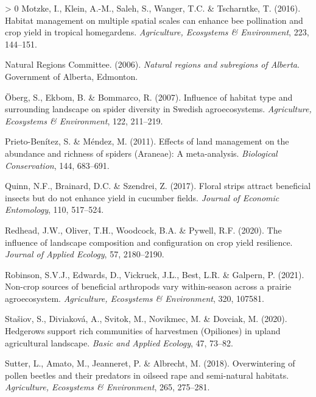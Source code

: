 \documentclass[]{elsarticle} %
\newlength{\cslhangindent}
\newenvironment{CSLReferences}[3] %
 {%
  \setlength{\parindent}{0pt}
  \ifodd #1 \everypar{\setlength{\hangindent}{\cslhangindent}}\ignorespaces\fi
  \ifnum #2 > 0
  \setlength{\parskip}{#2\baselineskip}
  \fi
 }%
 {}
\begin{document}
\begin{CSLReferences}{1}{0}
\leavevmode\hypertarget{ref-motzke2016}{}%
Motzke, I., Klein, A.-M., Saleh, S., Wanger, T.C. \& Tscharntke, T. (2016). Habitat management on multiple spatial scales can enhance bee pollination and crop yield in tropical homegardens. \emph{Agriculture, Ecosystems \& Environment}, 223, 144--151.

\leavevmode\hypertarget{ref-ABRegions2006}{}%
Natural Regions Committee. (2006). \emph{Natural regions and subregions of {Alberta}}. Government of Alberta, Edmonton.

\leavevmode\hypertarget{ref-oberg2007}{}%
Öberg, S., Ekbom, B. \& Bommarco, R. (2007). Influence of habitat type and surrounding landscape on spider diversity in {Swedish} agroecosystems. \emph{Agriculture, Ecosystems {\&} Environment}, 122, 211--219.

\leavevmode\hypertarget{ref-prietoBenitez2011}{}%
Prieto-Benítez, S. \& Méndez, M. (2011). Effects of land management on the abundance and richness of spiders ({Araneae}): A meta-analysis. \emph{Biological Conservation}, 144, 683--691.

\leavevmode\hypertarget{ref-quinn2017}{}%
Quinn, N.F., Brainard, D.C. \& Szendrei, Z. (2017). Floral strips attract beneficial insects but do not enhance yield in cucumber fields. \emph{Journal of Economic Entomology}, 110, 517--524.

\leavevmode\hypertarget{ref-redhead2020}{}%
Redhead, J.W., Oliver, T.H., Woodcock, B.A. \& Pywell, R.F. (2020). The influence of landscape composition and configuration on crop yield resilience. \emph{Journal of Applied Ecology}, 57, 2180--2190.

\leavevmode\hypertarget{ref-robinson2021}{}%
Robinson, S.V.J., Edwards, D., Vickruck, J.L., Best, L.R. \& Galpern, P. (2021). Non-crop sources of beneficial arthropods vary within-season across a prairie agroecosystem. \emph{Agriculture, Ecosystems {\&} Environment}, 320, 107581.

\leavevmode\hypertarget{ref-stasiov2020}{}%
Stašiov, S., Diviaková, A., Svitok, M., Novikmec, M. \& Dovciak, M. (2020). Hedgerows support rich communities of harvestmen ({Opiliones}) in upland agricultural landscape. \emph{Basic and Applied Ecology}, 47, 73--82.

\leavevmode\hypertarget{ref-sutter2018b}{}%
Sutter, L., Amato, M., Jeanneret, P. \& Albrecht, M. (2018). Overwintering of pollen beetles and their predators in oilseed rape and semi-natural habitats. \emph{Agriculture, Ecosystems {\&} Environment}, 265, 275--281.


\end{CSLReferences}
\end{document}
